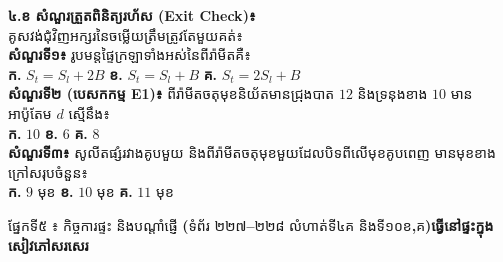 \documentclass[a4paper,10pt]{article}
\newcommand{\en}[1]{{\TimesEn #1}}
\newcommand{\enbf}[1]{{\TimesEn\textbf{#1}}}
\newcommand{\secbar}[2]{%
  \vspace{3pt}%
  \begin{tcolorbox}[
    enhanced, sharp corners, colback=headgray, colframe=black,
    boxrule=0.9pt, boxsep=1pt, top=2.5pt, bottom=2.5pt, left=6pt, right=6pt,
    after skip=3pt
  ]
    {\muol\fontsize{9.2pt}{13.5pt}\selectfont #1}\hfill{\fontsize{8.3pt}{11.5pt}\selectfont\textbf{#2}}
  \end{tcolorbox}%
}
\begin{document}
\hfill
\begin{minipage}[t]{8.5cm}\vspace{0pt}
  \begin{tcolorbox}[
    enhanced, sharp corners, colback=white, colframe=black, equal height group=rowE5,
    boxrule=0.85pt, boxsep=3pt, top=5pt, bottom=5pt, left=5.5pt, right=5.5pt
  ]\raggedright
    \textbf{៤.ខ សំណួរត្រួតពិនិត្យរហ័ស (\en{Exit Check})៖}\\
    គូសវង់ជុំវិញអក្សរនៃចម្លើយត្រឹមត្រូវតែមួយគត់៖\\[5.5pt]
    \textbf{សំណួរទី១៖} រូបមន្តផ្ទៃក្រឡាទាំងអស់នៃពីរ៉ាមីតគឺ៖\\[2pt]
    \hspace*{0.15cm}\textbf{ក.} $S_t = S_l + 2B$ \hspace{0.3cm} \textbf{ខ.} $S_t = S_l + B$ \hspace{0.3cm} \textbf{គ.} $S_t = 2S_l + B$\\[6.5pt]
    \textbf{សំណួរទី២ (បេសកកម្ម \en{E1})៖} ពីរ៉ាមីតចតុមុខនិយ័តមានជ្រុងបាត $12$ និងទ្រនុងខាង $10$ មានអាប៉ូតែម $d$ ស្មើនឹង៖\\[2pt]
    \hspace*{0.15cm}\textbf{ក.} $10$ \hspace{0.75cm} \textbf{ខ.} $6$ \hspace{0.75cm} \textbf{គ.} $8$\\[6.5pt]
    \textbf{សំណួរទី៣៖} សូលីតផ្សំរវាងគូបមួយ និងពីរ៉ាមីតចតុមុខមួយដែលបិទពីលើមុខគូបពេញ មានមុខខាងក្រៅសរុបចំនួន៖\\[2pt]
    \hspace*{0.15cm}\textbf{ក.} $9$ មុខ \hspace{0.55cm} \textbf{ខ.} $10$ មុខ \hspace{0.55cm} \textbf{គ.} $11$ មុខ
  \end{tcolorbox}
\end{minipage}

\vspace{7pt}
\secbar{ផ្នែកទី៥ ៖ កិច្ចការផ្ទះ និងបណ្ដាំផ្ញើ \enbf{(}ទំព័រ ២២៧\enbf{--}២២៨ លំហាត់ទី៤គ និងទី១០ខ\enbf{,}គ\enbf{)}}{ធ្វើនៅផ្ទះក្នុងសៀវភៅសរសេរ}
\end{document}
